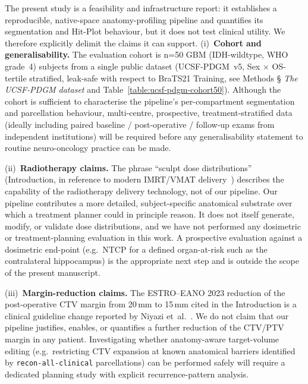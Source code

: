 \documentclass[a4paper,11pt,leqno]{article}
\begin{document}
The present study is a feasibility and infrastructure report: it
establishes a reproducible, native-space anatomy-profiling pipeline and
quantifies its segmentation and Hit-Plot behaviour, but it does not test
clinical utility. We therefore explicitly delimit the claims it can
support. (i)~\textbf{Cohort and generalisability.} The
evaluation cohort is n=50 GBM
(IDH-wildtype, WHO grade~4) subjects from a single public dataset
(UCSF-PDGM~v5, Sex $\times$ OS-tertile stratified, leak-safe with respect
to BraTS21 Training, see Methods § \emph{The UCSF-PDGM dataset} and
Table~\ref{table:ucsf-pdgm-cohort50}). Although the cohort is sufficient
to characterise the pipeline's per-compartment segmentation and
parcellation behaviour, multi-centre, prospective, treatment-stratified
data (ideally including paired baseline / post-operative / follow-up
exams from independent institutions) will be required before any
generalisability statement to routine neuro-oncology practice can be
made.

(ii)~\textbf{Radiotherapy claims.} The
phrase ``sculpt dose distributions'' (Introduction, in reference to
modern IMRT/VMAT delivery~\cite{Niyazi2023,Palma2019}) describes the capability of
the radiotherapy delivery technology, not of our pipeline. Our pipeline
contributes a more detailed, subject-specific anatomical substrate over
which a treatment planner could in principle reason. It does not itself generate, modify, or validate dose distributions, and we have not
performed any dosimetric or treatment-planning evaluation in this work.
A prospective evaluation against a dosimetric end-point (e.g.\ NTCP for
a defined organ-at-risk such as the contralateral hippocampus) is the
appropriate next step and is outside the scope of the present
manuscript.

(iii)~\textbf{Margin-reduction claims.}
The ESTRO--EANO 2023 reduction of the post-operative CTV margin from
20\,mm to 15\,mm cited in the Introduction is a clinical
guideline change reported by Niyazi et~al.~\cite{Niyazi2023}. We do not claim that our pipeline justifies, enables,
or quantifies a further reduction of the CTV/PTV margin in any patient.
Investigating whether anatomy-aware target-volume editing (e.g.\
restricting CTV expansion at known anatomical barriers identified by
\texttt{recon-all-clinical} parcellations) can be performed safely will
require a dedicated planning study with explicit recurrence-pattern
analysis.
\end{document}
